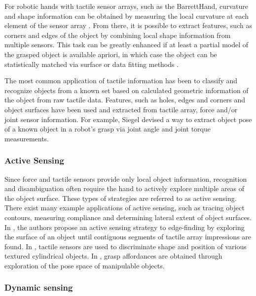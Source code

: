 For robotic hands with tactile sensor arrays, such as the BarrettHand, curvature and shape information can be obtained by measuring the local curvature at each element of the sensor array \cite{cutkosky2008force}.
From there, it is possible to extract features, such as corners and edges of the object by combining local shape information from multiple sensors.
This task can be greatly enhanced if at least a partial model of the grasped object is available apriori, in which case the object can be statistically matched via surface or data fitting methods \cite{fearing1990tactile}.

The most common application of tactile information has been to classify and recognize objects from a known set based on calculated geometric information of the object from raw tactile data.
Features, such as holes, edges and corners \cite{cutkosky2008force} and object surfaces \cite{overton1981tactile} have been used and extracted from tactile array, force and/or joint sensor information.
For example, Siegel \cite{siegel1991finding} devised a way to extract object pose of a known object in a robot's grasp via joint angle and joint torque measurements.

\subsubsection*{Active Sensing}
Since force and tactile sensors provide only local object information, recognition and disambiguation often require the hand to actively explore multiple areas of the object surface.
These types of strategies are referred to as active sensing.
There exist many example applications of active sensing, such as tracing object contours, measuring compliance and determining lateral extent of object surfaces.
In \cite{muthukrishnan1987edge}, the authors propose an active sensing strategy to edge-finding by exploring the surface of an object until contiguous segments of tactile array impressions are found.
In \cite{lepora2012embodied}, tactile sensors are used to discriminate shape and position of various textured cylindrical objects.
In \cite{Detry2011}, grasp affordances are obtained through exploration of the pose space of manipulable objects. 

\subsubsection*{Dynamic sensing}

